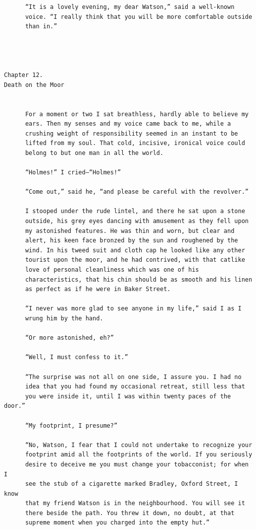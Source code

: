 \documentclass{article}
\begin{document}
\begin{verbatim}
      “It is a lovely evening, my dear Watson,” said a well-known
      voice. “I really think that you will be more comfortable outside
      than in.”




Chapter 12.
Death on the Moor


      For a moment or two I sat breathless, hardly able to believe my
      ears. Then my senses and my voice came back to me, while a
      crushing weight of responsibility seemed in an instant to be
      lifted from my soul. That cold, incisive, ironical voice could
      belong to but one man in all the world.

      “Holmes!” I cried—“Holmes!”

      “Come out,” said he, “and please be careful with the revolver.”

      I stooped under the rude lintel, and there he sat upon a stone
      outside, his grey eyes dancing with amusement as they fell upon
      my astonished features. He was thin and worn, but clear and
      alert, his keen face bronzed by the sun and roughened by the
      wind. In his tweed suit and cloth cap he looked like any other
      tourist upon the moor, and he had contrived, with that catlike
      love of personal cleanliness which was one of his
      characteristics, that his chin should be as smooth and his linen
      as perfect as if he were in Baker Street.

      “I never was more glad to see anyone in my life,” said I as I
      wrung him by the hand.

      “Or more astonished, eh?”

      “Well, I must confess to it.”

      “The surprise was not all on one side, I assure you. I had no
      idea that you had found my occasional retreat, still less that
      you were inside it, until I was within twenty paces of the door.”

      “My footprint, I presume?”

      “No, Watson, I fear that I could not undertake to recognize your
      footprint amid all the footprints of the world. If you seriously
      desire to deceive me you must change your tobacconist; for when I
      see the stub of a cigarette marked Bradley, Oxford Street, I know
      that my friend Watson is in the neighbourhood. You will see it
      there beside the path. You threw it down, no doubt, at that
      supreme moment when you charged into the empty hut.”


\end{verbatim}
\end{document}
